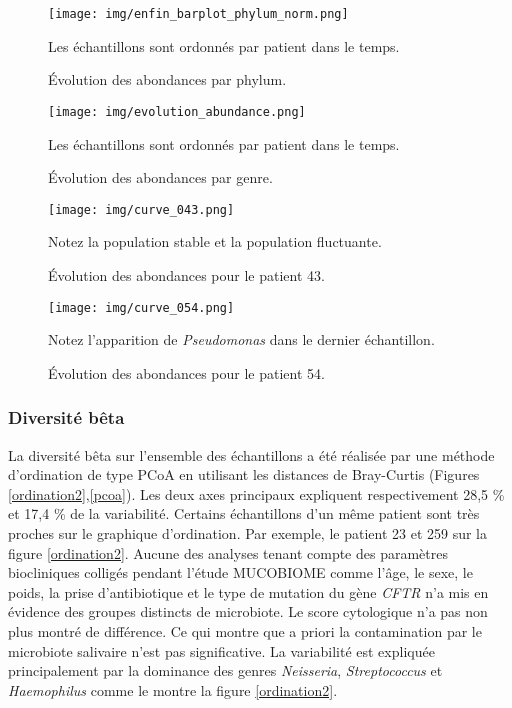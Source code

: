 \documentclass[12pt,a4paper]{article}
\begin{document}
\begin{figure}[H]
\begin{center}
\texttt{[image: img/enfin\_barplot\_phylum\_norm.png]}\hfill
\caption{Évolution des abondances par phylum.} Les échantillons sont ordonnés par patient dans le temps.
\label{plotabundancephylum}
\end{center}
\end{figure}


\begin{figure}[H]
\begin{center}
\texttt{[image: img/evolution\_abundance.png]}\hfill
\caption{Évolution des abondances par genre.}
Les échantillons sont ordonnés par patient dans le temps.
\label{plotabundancecurve}

\end{center}

\end{figure}





\begin{figure}[H]
\begin{center}
\texttt{[image: img/curve\_043.png]}\hfill
\caption{Évolution des abondances pour le patient 43.}
Notez la population stable et la population fluctuante.
\label{evolution43}
\end{center}

\end{figure}

\begin{figure}[H]
\begin{center}
\texttt{[image: img/curve\_054.png]}\hfill
\caption{Évolution des abondances pour le patient 54.}
Notez l'apparition de \textit{Pseudomonas} dans le dernier échantillon.
\label{evolution54}
\end{center}

\end{figure}

\subsubsection{Diversité bêta}
La diversité bêta sur l’ensemble des échantillons a été réalisée par une méthode d’ordination de type PCoA en utilisant les distances de Bray-Curtis (Figures \ref{ordination2},\ref{pcoa}).
Les deux axes principaux expliquent respectivement 28,5 \% et 17,4 \% de la variabilité.
Certains échantillons d’un même patient sont très proches sur le graphique d’ordination. Par exemple, le patient 23 et 259 sur la figure \ref{ordination2}.
Aucune des analyses tenant compte des paramètres biocliniques colligés pendant l'étude MUCOBIOME comme l'âge, le sexe, le poids, la prise d'antibiotique et le type de mutation du gène \textit{CFTR} n’a mis en évidence des groupes distincts de microbiote. Le score cytologique n'a pas non plus montré de différence. Ce qui montre que a priori la contamination par le microbiote salivaire n'est pas significative.
La variabilité est expliquée principalement par la dominance des genres \textit{Neisseria}, \textit{Streptococcus} et \textit{Haemophilus} comme le montre la figure \ref{ordination2}.
\end{document}
